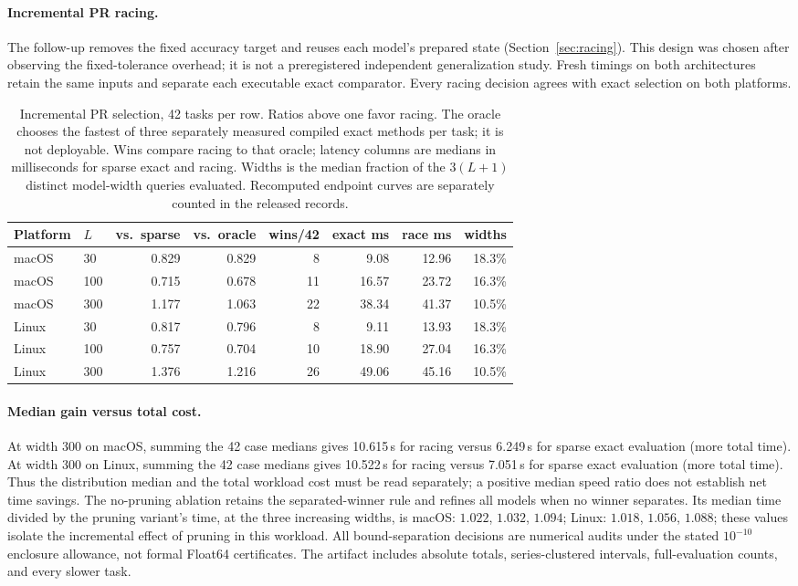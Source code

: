 \paragraph{Incremental PR racing.}
The follow-up removes the fixed accuracy target and reuses each model's
prepared state (Section~\ref{sec:racing}). This design was chosen after
observing the fixed-tolerance overhead; it is not a preregistered
independent generalization study. Fresh timings on both architectures
retain the same inputs and separate each executable exact comparator.
Every racing decision agrees with exact selection on both platforms.
\begin{table}[t]\centering
\begin{tabular}{llrrrrrr}\toprule
Platform & $L$ & vs.\ sparse & vs.\ oracle & wins/42 & exact ms & race ms & widths \\\midrule
macOS & 30 & 0.829 & 0.829 & 8 & 9.08 & 12.96 & 18.3\% \\
macOS & 100 & 0.715 & 0.678 & 11 & 16.57 & 23.72 & 16.3\% \\
macOS & 300 & 1.177 & 1.063 & 22 & 38.34 & 41.37 & 10.5\% \\
Linux & 30 & 0.817 & 0.796 & 8 & 9.11 & 13.93 & 18.3\% \\
Linux & 100 & 0.757 & 0.704 & 10 & 18.90 & 27.04 & 16.3\% \\
Linux & 300 & 1.376 & 1.216 & 26 & 49.06 & 45.16 & 10.5\% \\
\bottomrule\end{tabular}
\caption{Incremental PR selection, 42 tasks per row. Ratios above one
favor racing. The oracle chooses the fastest of three separately
measured compiled exact methods per task; it is not deployable.
Wins compare racing to that oracle; latency columns are medians in
milliseconds for sparse exact and racing. Widths is the median fraction
of the $3(L+1)$ distinct model-width queries evaluated. Recomputed
endpoint curves are separately counted in the released records.}
\label{tab:selection}\end{table}
\paragraph{Median gain versus total cost.}
At width 300 on macOS, summing the 42 case medians gives 10.615\,s for racing versus 6.249\,s for sparse exact evaluation (more total time).
At width 300 on Linux, summing the 42 case medians gives 10.522\,s for racing versus 7.051\,s for sparse exact evaluation (more total time).
Thus the distribution median and the total workload cost must be read separately; a positive median speed ratio does not establish net time savings.
The no-pruning ablation retains the separated-winner rule and refines
all models when no winner separates. Its median time divided by the
pruning variant's time, at the three increasing widths, is
macOS: $1.022$, $1.032$, $1.094$;
Linux: $1.018$, $1.056$, $1.088$;
these values isolate the incremental effect of pruning in this workload.
All bound-separation decisions are numerical audits under the stated
$10^{-10}$ enclosure allowance, not formal Float64 certificates.
The artifact includes absolute totals, series-clustered intervals,
full-evaluation counts, and every slower task.
